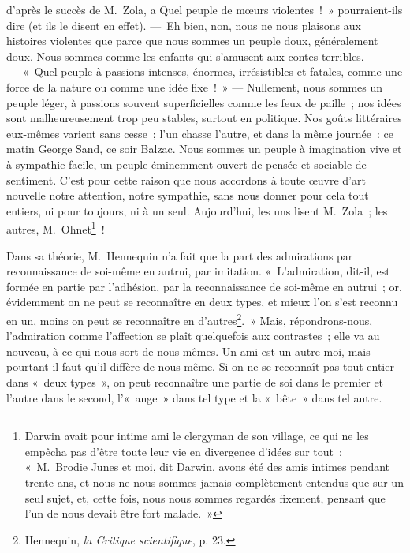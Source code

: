 \documentclass[french,twoside]{book} %
\begin{document}
d’après le succès de M. Zola, a Quel peuple de mœurs violentes ! » pourraient-ils dire (et ils le disent en effet). — Eh bien, non, nous ne nous plaisons aux histoires violentes que parce que nous sommes un peuple doux, généralement doux. Nous sommes comme les enfants qui s’amusent aux contes terribles. — « Quel peuple à passions intenses, énormes, irrésistibles et fatales, comme une force de la nature ou comme une idée fixe ! » — Nullement, nous sommes un peuple léger, à passions souvent superficielles comme les feux de paille ; nos idées sont malheureusement trop peu stables, surtout en politique. Nos goûts littéraires eux-mêmes varient sans cesse ; l’un chasse l’autre, et dans la même journée : ce matin George Sand, ce soir Balzac. Nous sommes un peuple à imagination vive et à sympathie facile, un peuple éminemment ouvert de pensée et sociable de sentiment. C’est pour cette raison que nous accordons à toute œuvre d’art nouvelle notre attention, notre sympathie, sans nous donner pour cela tout entiers, ni pour toujours, ni à un seul. Aujourd’hui, les uns lisent M. Zola ; les autres, M. Ohnet\footnote{Darwin avait pour intime ami le clergyman de son village, ce qui ne les empêcha pas d’être toute leur vie en divergence d’idées sur tout : « M. Brodie Junes et moi, dit Darwin, avons été des amis intimes pendant trente ans, et nous ne nous sommes jamais complètement entendus que sur un seul sujet, et, cette fois, nous nous sommes regardés fixement, pensant que l’un de nous devait être fort malade. »} !\par
Dans sa théorie, M. Hennequin n’a fait que la part des admirations par reconnaissance de soi-même en autrui, par imitation. « L’admiration, dit-il, est formée en partie par l’adhésion, par la reconnaissance de soi-même en autrui ; or, évidemment on ne peut se reconnaître en deux types, et mieux l’on s’est reconnu en un, moins on peut se reconnaître en d’autres\footnote{ Hennequin, \emph{la Critique scientifique}, p. 23.}. » Mais, répondrons-nous, l’admiration comme l’affection se plaît quelquefois aux contrastes ; elle va au nouveau, à ce qui nous sort de nous-mêmes. Un ami est un autre moi, mais pourtant il faut qu’il diffère de nous-même. Si on ne se reconnaît pas tout entier dans « deux types », on peut reconnaître une partie de soi dans le premier et l’autre dans le second, l’« ange » dans tel type et la « bête » dans tel autre.\par
\end{document}
